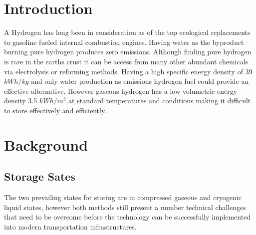 \documentclass[paper=a4, fontsize=11pt, abstract=on]{scrartcl}
\numberwithin{equation}{section}		%
\numberwithin{figure}{section}			%
\numberwithin{table}{section}				%
\begin{document}
 
\printnomenclature

\newpage

\section{Introduction}


A Hydrogen has long been in consideration as of the top ecological replacements to gasoline fueled internal combustion engines. Having water as the byproduct burning pure hydrogen produces zero emissions. Although finding pure hydrogen is rare in the earths crust it can be access from many other abundant chemicals via electrolysis or reforming methods. Having a high specific energy density of 39 $kWh/kg$ and only water production as emissions hydrogen fuel could provide an effective alternative. However gaseous hydrogen has a low volumetric energy density 3.5 $kWh/m^3$ at standard temperatures  and conditions making it difficult to store effectively and efficiently. 

\section{Background}
\subsection{Storage Sates}
The two prevailing states for storing are in compressed gaseous and cryogenic liquid states, however both methods still present a number technical challenges that need to be overcome before the technology can be successfully implemented into modern transportation infrastructures. 
\end{document}
